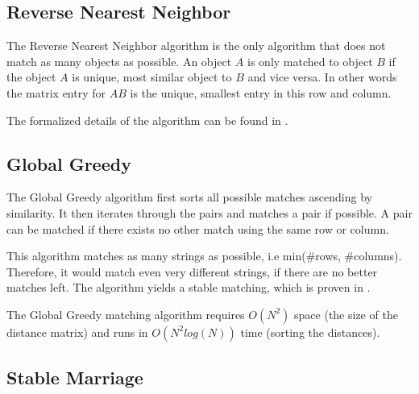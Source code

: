 \documentclass[a4paper,11pt]{article}
\begin{document}
\subsection{Reverse Nearest Neighbor}

The Reverse Nearest Neighbor algorithm is the only algorithm that does not match as many objects as possible.
An object $A$ is only matched to object $B$ if the object $A$ is unique, most similar object to $B$ and vice versa. In other words the matrix entry for $AB$ is the unique, smallest entry in this row and column.

The formalized details of the algorithm can be found in \cite[p. 29]{rnn}.
  
\subsection{Global Greedy}

The Global Greedy algorithm first sorts all possible matches ascending by similarity. It then iterates through the pairs and matches a pair if possible. A pair can be matched if there exists no other match using the same row or column.

This algorithm matches as many strings as possible, i.e min(\#rows, \#columns). Therefore, it would match even very different strings, if there are no better matches left. The algorithm yields a stable matching, which is proven in \cite{augsten}.


The Global Greedy matching algorithm requires $O(N^2)$ space (the size of the distance matrix) and runs in $O(N^2 log(N))$ time (sorting the distances).

\subsection{Stable Marriage}
\end{document}

